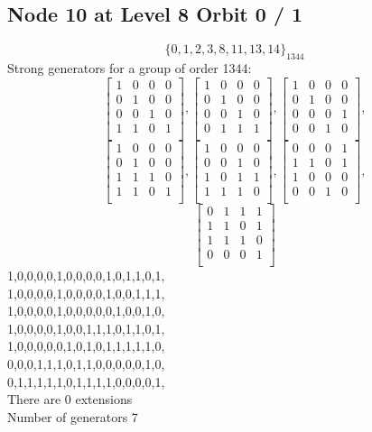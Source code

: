 \subsection*{Node 10 at Level 8 Orbit 0 / 1}
$$
\{ 0, 1, 2, 3, 8, 11, 13, 14 \}_{1344}$$
{\small\arraycolsep=2pt
Strong generators for a group of order 1344:
$$
\left[
\begin{array}{*{4}{r}}
1 & 0 & 0 & 0\\
0 & 1 & 0 & 0\\
0 & 0 & 1 & 0\\
1 & 1 & 0 & 1\\
\end{array}
\right]
, 
\left[
\begin{array}{*{4}{r}}
1 & 0 & 0 & 0\\
0 & 1 & 0 & 0\\
0 & 0 & 1 & 0\\
0 & 1 & 1 & 1\\
\end{array}
\right]
, 
\left[
\begin{array}{*{4}{r}}
1 & 0 & 0 & 0\\
0 & 1 & 0 & 0\\
0 & 0 & 0 & 1\\
0 & 0 & 1 & 0\\
\end{array}
\right]
, 
$$
$$
\left[
\begin{array}{*{4}{r}}
1 & 0 & 0 & 0\\
0 & 1 & 0 & 0\\
1 & 1 & 1 & 0\\
1 & 1 & 0 & 1\\
\end{array}
\right]
, 
\left[
\begin{array}{*{4}{r}}
1 & 0 & 0 & 0\\
0 & 0 & 1 & 0\\
1 & 0 & 1 & 1\\
1 & 1 & 1 & 0\\
\end{array}
\right]
, 
\left[
\begin{array}{*{4}{r}}
0 & 0 & 0 & 1\\
1 & 1 & 0 & 1\\
1 & 0 & 0 & 0\\
0 & 0 & 1 & 0\\
\end{array}
\right]
, 
$$
$$
\left[
\begin{array}{*{4}{r}}
0 & 1 & 1 & 1\\
1 & 1 & 0 & 1\\
1 & 1 & 1 & 0\\
0 & 0 & 0 & 1\\
\end{array}
\right]
$$
1,0,0,0,0,1,0,0,0,0,1,0,1,1,0,1,\\
1,0,0,0,0,1,0,0,0,0,1,0,0,1,1,1,\\
1,0,0,0,0,1,0,0,0,0,0,1,0,0,1,0,\\
1,0,0,0,0,1,0,0,1,1,1,0,1,1,0,1,\\
1,0,0,0,0,0,1,0,1,0,1,1,1,1,1,0,\\
0,0,0,1,1,1,0,1,1,0,0,0,0,0,1,0,\\
0,1,1,1,1,1,0,1,1,1,1,0,0,0,0,1,\\
}
There are 0 extensions\\
Number of generators 7\\

